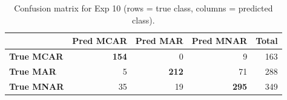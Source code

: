 \begin{table}[htbp]
\centering
\caption{Confusion matrix for Exp 10 (rows = true class, columns = predicted class).}
\label{tab:cm-exp-10}
\begin{tabular}{l|rrr|r}
\toprule
 & \textbf{Pred MCAR} & \textbf{Pred MAR} & \textbf{Pred MNAR} & \textbf{Total} \\
\midrule
\textbf{True MCAR} & \textbf{154} & 0 & 9 & 163 \\
\textbf{True MAR} & 5 & \textbf{212} & 71 & 288 \\
\textbf{True MNAR} & 35 & 19 & \textbf{295} & 349 \\
\bottomrule
\end{tabular}
\end{table}